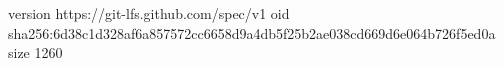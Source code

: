 version https://git-lfs.github.com/spec/v1
oid sha256:6d38c1d328af6a857572cc6658d9a4db5f25b2ae038cd669d6e064b726f5ed0a
size 1260
